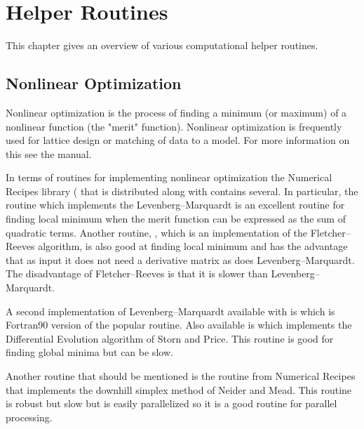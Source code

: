 \chapter{Helper Routines}
\label{c:helper}

This chapter gives an overview of various computational helper routines.

\section{Nonlinear Optimization}
\label{s:opti}

Nonlinear optimization is the process of finding a minimum (or
maximum) of a nonlinear function (the "merit" function). Nonlinear
optimization is frequently used for lattice design or matching of data
to a model. For more information on this see the \tao manual.

In terms of routines for implementing nonlinear optimization the
Numerical Recipes library ( that is distributed along
with \bmad contains several. In particular, 
the routine 
which implements the Levenberg--Marquardt is an excellent routine for
finding local minimum when the merit function can be expressed as the
sum of quadratic terms. Another routine, , which is an
implementation of the Fletcher--Reeves algorithm, is also good at
finding local minimum and has the advantage that as input it does not
need a derivative matrix as does Levenberg--Marquardt. The
disadvantage of Fletcher--Reeves is that it is slower than
Levenberg--Marquardt. 

A second implementation of Levenberg--Marquardt available with \bmad
is  which is Fortran90 version of the popular
 routine. Also available is  which implements
the Differential Evolution algorithm of Storn and
Price\cite{b:storn}. This routine is good for finding global minima
but can be slow. 

Another routine that should be mentioned is the  routine
from Numerical Recipes that implements the downhill simplex method of
Neider and Mead. This routine is robust but slow but is easily
parallelized so it is a good routine for parallel processing.

